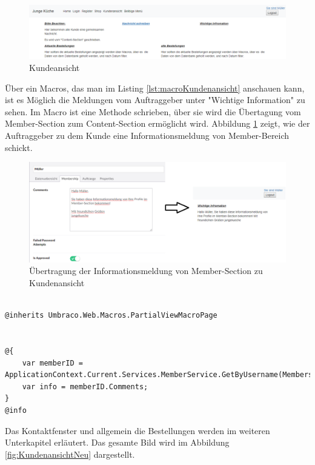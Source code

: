 \begin{figure}[h]
	\centering
	\includegraphics[width=1\linewidth]{Graphics/kundenansichtNew.png}
	\caption[Kundeansicht]{Kundeansicht}
	\label{fig:kundenansichtNew}
\end{figure}
Über ein Macros, das man im Listing \ref{lst:macroKundenansicht} anschauen kann, ist es Möglich die Meldungen vom Auftraggeber unter "Wichtige Information"  zu sehen. Im Macro ist eine Methode schrieben, über sie wird die Übertagung vom Member-Section zum Content-Section ermöglicht wird. Abbildung \ref{fig:kundenansichtNew} zeigt, wie der Auftraggeber zu dem Kunde eine Informationsmeldung von Member-Bereich schickt.
\begin{figure}[h]
	\centering
	\includegraphics[width=1\linewidth]{Graphics/kundenAnsichtWichtInf.png}
	\caption[Kundeansicht]{Übertragung der Informationsmeldung von Member-Section zu Kundenansicht}
	\label{fig:kundenAnsichtWichtInf}
\end{figure}
\pagebreak
\begin{lstlisting}[caption={Macro zum Kundenansicht}, label=lst:macroKundenansicht]

@inherits Umbraco.Web.Macros.PartialViewMacroPage


@{
	var memberID = ApplicationContext.Current.Services.MemberService.GetByUsername(Membership.GetUser().UserName);
	var info = memberID.Comments;
}
@info
\end{lstlisting}

Das Kontaktfenster und allgemein die Bestellungen werden im weiteren Unterkapitel erläutert. Das gesamte Bild wird im Abbildung \ref{fig:KundenansichtNeu} dargestellt.

